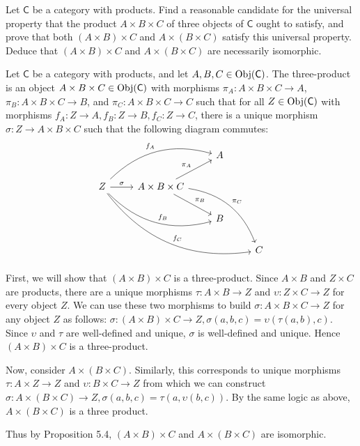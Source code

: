 \begin{problem}[5.9]
	Let $\mathsf{C}$ be a category with products. Find a reasonable candidate for the
	universal property that the product $A\times B\times C$ of three objects of $\mathsf{C}$
	ought to satisfy, and prove that both $(A\times B)\times C$ and $A\times
	(B\times C)$ satisfy this universal property. Deduce that $(A\times B)\times C$
	and $A\times (B\times C)$ are necessarily isomorphic.
\end{problem}
\begin{solution}
	Let $\mathsf{C}$ be a category with products, and let $A,B,C\in\mathrm{Obj}(\mathsf{C})$. The
	three-product is an object ${A\times B\times C}\in\mathrm{Obj}(\mathsf{C})$ with morphisms $\pi_A:{A\times B\times C}\to A$,
	$\pi_B:{A\times B\times C}\to B$, and $\pi_C:{A\times B\times C}\to C$ such that for all $Z\in\mathrm{Obj}(\mathsf{C})$ with
	morphisms $f_A:Z\to A,f_B:Z\to B,f_C:Z\to C$, there is a unique morphism
	$\sigma:Z\to{A\times B\times C}$ such that the following diagram commutes:
	\[\begin{tikzcd}
	&&A \\
	Z\arrow[r,"\sigma"]\arrow[urr,bend left,"f_A"]\arrow[drr,bend right,"f_B"]\arrow[ddrrr,bend right,"f_C"]&
	{A\times B\times C}\arrow[ur,"\pi_A"]\arrow[dr,"\pi_B"]\arrow[ddrr,bend left,"\pi_C"] \\
	&&B \\
	&&&C
	\end{tikzcd}\]
	
	First, we will show that $(A\times B)\times C$ is a three-product. Since
	$A\times B$ and $Z\times C$ are products, there are a unique morphisms
	$\tau:A\times B\to Z$ and $\upsilon:Z\times C\to Z$ for every object $Z$.  We
	can use these two morphisms to build $\sigma:{A\times B\times C}\to Z$ for any object $Z$ as
	follows: $\sigma:(A\times B)\times C\to Z, \sigma(a,b,c)=\upsilon(\tau(a,b),c)$.
	Since $\upsilon$ and $\tau$ are well-defined and unique, $\sigma$ is
	well-defined and unique. Hence $(A\times B)\times C$ is a three-product.
	
	Now, consider $A\times(B\times C)$. Similarly, this corresponds to unique
	morphisms $\tau:A\times Z\to Z$ and $\upsilon:B\times C\to Z$ from which we can
	construct $\sigma:A\times(B\times C)\to Z,\sigma(a,b,c)=\tau(a,\upsilon(b,c))$.
	By the same logic as above, $A\times(B\times C)$ is a three product.
	
	Thus by Proposition 5.4, $(A\times B)\times C$ and $A\times(B\times C)$ are
	isomorphic.
\end{solution}


